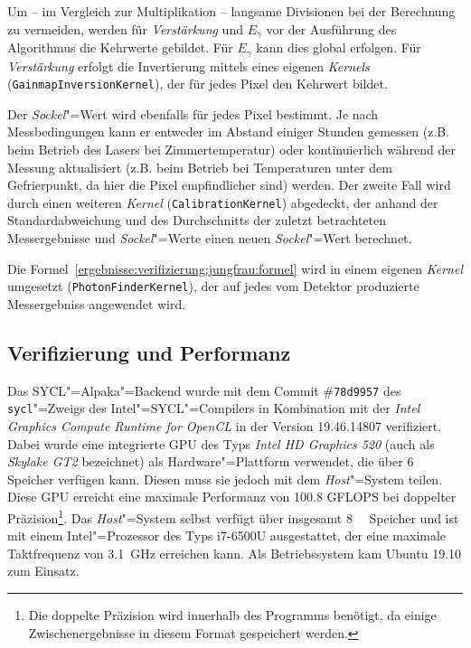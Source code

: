 Um -- im Vergleich zur Multiplikation -- langsame Divisionen bei der Berechnung
zu vermeiden, werden für \textit{Verstärkung} und $E_\gamma$ vor der Ausführung
des Algorithmus die Kehrwerte gebildet. Für $E_\gamma$ kann dies global
erfolgen. Für \textit{Verstärkung} erfolgt die Invertierung mittels eines
eigenen \textit{Kernels} (\texttt{GainmapInversionKernel}), der für jedes Pixel
den Kehrwert bildet.

Der \textit{Sockel}"=Wert wird ebenfalls für jedes Pixel bestimmt. Je nach
Messbedingungen kann er entweder im Abstand einiger Stunden gemessen (z.B. beim
Betrieb des Lasers bei Zimmertemperatur) oder kontinuierlich während der Messung
aktualisiert (z.B. beim Betrieb bei Temperaturen unter dem Gefrierpunkt, da hier
die Pixel empfindlicher sind) werden. Der zweite Fall wird durch einen weiteren
\textit{Kernel} (\texttt{CalibrationKernel}) abgedeckt, der anhand der
Standardabweichung und des Durchschnitts der zuletzt betrachteten Messergebnisse
und \textit{Sockel}"=Werte einen neuen \textit{Sockel}"=Wert berechnet.

Die Formel~\ref{ergebnisse:verifizierung:jungfrau:formel} wird in einem eigenen
\textit{Kernel} umgesetzt (\texttt{PhotonFinderKernel}), der auf jedes vom
Detektor produzierte Messergebniss angewendet wird.

\subsection{Verifizierung und Performanz}
\label{ergebnisse:verifizierung:performanz}

Das SYCL"=Alpaka"=Backend wurde mit dem Commit \#\texttt{78d9957} des
\texttt{sycl}"=Zweigs des Intel"=SYCL"=Compilers in Kombination mit der
\textit{Intel Graphics Compute Runtime for OpenCL} in der Version 19.46.14807
verifiziert. Dabei wurde eine integrierte GPU des Typs \textit{Intel HD Graphics
520} (auch als \textit{Skylake GT2} bezeichnet) als Hardware"=Plattform
verwendet, die über \SI{6}{\gibi\byte} Speicher verfügen kann. Diesen muss sie
jedoch mit dem \textit{Host}"=System teilen. Diese GPU erreicht eine maximale
Performanz von \num{100.8} GFLOPS bei doppelter Präzision\footnote{Die doppelte
Präzision wird innerhalb des Programms benötigt, da einige Zwischenergebnisse in
diesem Format gespeichert werden.}. Das \textit{Host}"=System selbst verfügt
über insgesamt \SI{8}{\gibi\byte} Speicher und ist mit einem Intel"=Prozessor
des Typs i7-6500U ausgestattet, der eine maximale Taktfrequenz von
\SI{3.1}{\giga\hertz} erreichen kann. Als Betriebssystem kam Ubuntu 19.10 zum
Einsatz.

